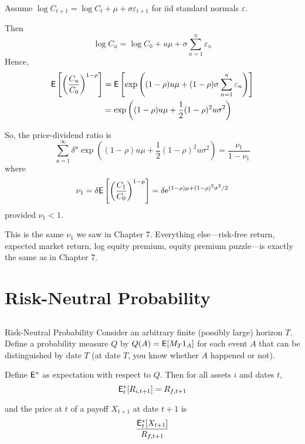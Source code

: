 \documentclass[xcolor=dvipsnames,10pt]{beamer}
\begin{document}
\begin{frame}[plain]
Assume $\log C_{t+1} = \log C_t + \mu + \sigma \varepsilon_{t+1}$ for iid standard normals $\varepsilon$.  

Then 
$$\log C_u = \log C_0 + u\mu + \sigma \sum_{n=1}^u \varepsilon_n$$
Hence,
\begin{align*}
    \mathsf{E} \left[\left(\frac{C_u}{C_0}\right)^{1-\rho}\right] &= \mathsf{E} \left[\exp \left((1-\rho)u\mu + (1-\rho)\sigma \sum_{n=1}^u \varepsilon_n\right)\right]\\
 &=\exp \left((1-\rho)u\mu + \frac{1}{2}(1-\rho)^2u\sigma^2 \right)   
\end{align*}

\end{frame}

\begin{frame}[plain]

So, the price-dividend ratio is
$$ \sum_{u=1}^\infty \delta^{u}\exp \left((1-\rho)u\mu + \frac{1}{2}(1-\rho)^2u\sigma^2 \right) = \frac{\nu_1}{1-\nu_1}$$
where
$$\nu_1 = \delta \mathsf{E}\left[\left(\frac{C_1}{C_0}\right)^{1-\rho}\right] = \delta\mathrm{e}^{(1-\rho)\mu + (1-\rho)^2\sigma^2/2}$$
provided $\nu_1<1$.  

This is the same $\nu_1$ we saw in Chapter 7.  Everything else---risk-free return, expected market return, log equity premium, equity premium puzzle---is exactly the same as in Chapter 7.

\end{frame}

\section{Risk-Neutral Probability}\subsection{}
\begin{frame}{Risk-Neutral Probability}
    Consider an arbitrary finite (possibly large) horizon $T$.  Define a probability measure $Q$ by
    $Q(A) = \mathsf{E}[M_T1_A]$ for each event $A$ that can be distinguished by date $T$ (at date $T$, you know whether $A$ happened or not).
    
    Define $\mathsf{E}^*$ as expectation with respect to $Q$.  Then for all assets $i$ and dates $t$,
    $$\mathsf{E}^*_t[R_{i,t+1}] = R_{f,t+1}$$
    
    and the price at $t$ of a payoff $X_{t+1}$ at date $t+1$ is
    $$\frac{\mathsf{E}^*_t[X_{t+1}]}{R_{f,t+1}}$$
\end{frame}
\end{document}
